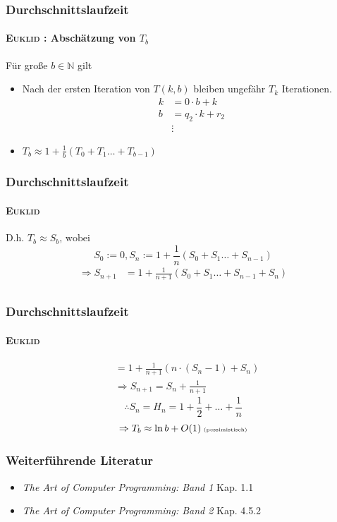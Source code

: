 \documentclass[•]{beamer}
\begin{document}
	

	\begin{frame}	
		\frametitle{Durchschnittslaufzeit}
	\framesubtitle{\textsc{Euklid} : Absch\"atzung von $T_b$}
	F\"ur gro{\ss}e $b \in \mathbb{N}$ gilt
	\begin{itemize}
	\item Nach der ersten Iteration von $T(k,b)$ bleiben ungef\"ahr $T_{k}$ Iterationen.
	\begin{align*}
	k&=0\cdot b + k\\
	b&=q_{2}\cdot k + r_2\\
	&\vdots
\end{align*}		
	\item $T_b \approx 1 + \frac{1}{b} (T_0 + T_1 \dots + T_{b-1})$
	\end{itemize}
\end{frame}		

\begin{frame}
\frametitle{Durchschnittslaufzeit}
	\framesubtitle{\textsc{Euklid}}
	
	$ \text{D.h. }T_b \approx S_b \text{, wobei }$ $$S_0 := 0, S_n := 1 + \frac{1}{n} (S_0 + S_1 \dots + S_{n-1})$$
	\begin{align*}
	\Rightarrow S_{n+1} &= 1 + \frac{1}{n+1}(S_0 + S_1 \dots + S_{n-1}+ S_n)\\
	\end{align*}
	
\end{frame}

\begin{frame}
\frametitle{Durchschnittslaufzeit}
	\framesubtitle{\textsc{Euklid}}
\begin{align*}
&= 1 + \frac{1}{n+1}(n\cdot (S_n - 1) + S_n)\\
	&\Rightarrow S_{n+1}= S_n + \frac{1}{n+1}
\end{align*}
$$\therefore S_n = H_n = 1 + \frac{1}{2} + \dots +\frac{1}{n}$$ $$ \Rightarrow T_b \approx \ln b + O(1)\text{\tiny{ (pessimistisch)}}$$

\end{frame}

\begin{frame}
\frametitle{Weiterf\"uhrende Literatur}
\begin{itemize}
\item \textit{The Art of Computer Programming: Band 1} Kap. 1.1
\item \textit{The Art of Computer Programming: Band 2} Kap. 4.5.2
\end{itemize}
\end{frame}
\end{document}
